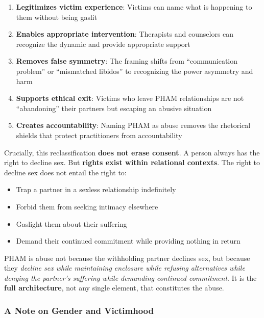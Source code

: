 \documentclass[12pt, letterpaper]{article}
\begin{document}
\begin{enumerate}
    \item \textbf{Legitimizes victim experience}: Victims can name what is happening to them without being gaslit
    
    \item \textbf{Enables appropriate intervention}: Therapists and counselors can recognize the dynamic and provide appropriate support
    
    \item \textbf{Removes false symmetry}: The framing shifts from ``communication problem'' or ``mismatched libidos'' to recognizing the power asymmetry and harm
    
    \item \textbf{Supports ethical exit}: Victims who leave PHAM relationships are not ``abandoning'' their partners but escaping an abusive situation
    
    \item \textbf{Creates accountability}: Naming PHAM as abuse removes the rhetorical shields that protect practitioners from accountability
\end{enumerate}

Crucially, this reclassification \textbf{does not erase consent}. A person always has the right to decline sex. But \textbf{rights exist within relational contexts}. The right to decline sex does not entail the right to:

\begin{itemize}
    \item Trap a partner in a sexless relationship indefinitely
    \item Forbid them from seeking intimacy elsewhere
    \item Gaslight them about their suffering
    \item Demand their continued commitment while providing nothing in return
\end{itemize}

PHAM is abuse not because the withholding partner declines sex, but because they \textit{decline sex while maintaining enclosure while refusing alternatives while denying the partner's suffering while demanding continued commitment}. It is the \textbf{full architecture}, not any single element, that constitutes the abuse.

\subsubsection{A Note on Gender and Victimhood}
\end{document}
